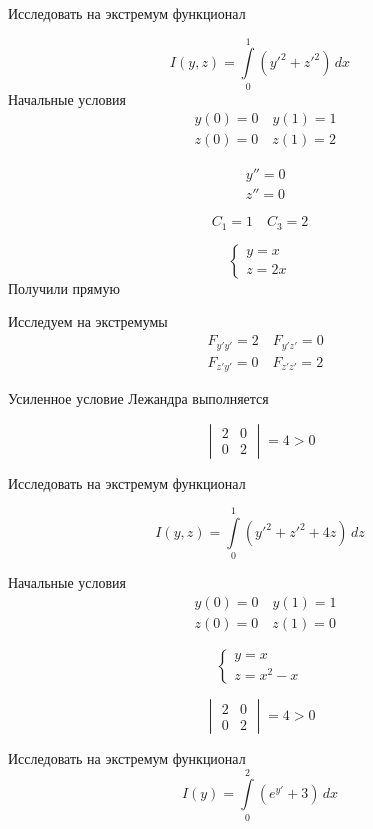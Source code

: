 \begin{example}{Исследовать на экстремум функционал}

\[
I(y,z) = \int\limits_0^1 (y'^2 + z'^2)\, dx
\]
Начальные условия
\begin{align*}
&y(0) = 0 \quad y(1) = 1\\
&z(0) = 0 \quad z(1) = 2
\end{align*}

\begin{align*}
&y'' = 0\\
&z'' = 0
\end{align*}

\[C_1 = 1 \quad C_3 = 2\]

\[
\begin{cases}
y = x\\
z = 2 x
\end{cases}
\]
Получили прямую

Исследуем на экстремумы
\begin{align*}
&F_{y'y'} = 2 \quad F_{y'z'} = 0\\
&F_{z'y'}=0 \quad F_{z'z'} = 2
\end{align*}

Усиленное условие Лежандра выполняется

\[ 
\begin{vmatrix} 
 2& 0 \\
0& 2
\end{vmatrix} = 4 > 0
\]
\end{example}
\begin{example}{Исследовать на экстремум функционал}

\[
I(y,z) = \int\limits_0^1 (y'^2 +z'^2 + 4 z)\, dz
\]

Начальные условия
\begin{align*}
&y(0) = 0 \quad y(1) = 1\\
&z(0) = 0 \quad z(1) = 0
\end{align*}

\[
\begin{cases}
y = x\\
z = x^2 - x
\end{cases}
\]

\[
\begin{vmatrix} 
 2& 0 \\
0& 2
\end{vmatrix} = 4 > 0
\]
\end{example}

\begin{example}{Исследовать на экстремум функционал}
\[
I(y) = \int\limits_0^2 (e^{y'} + 3)\, dx
\]
\end{example}